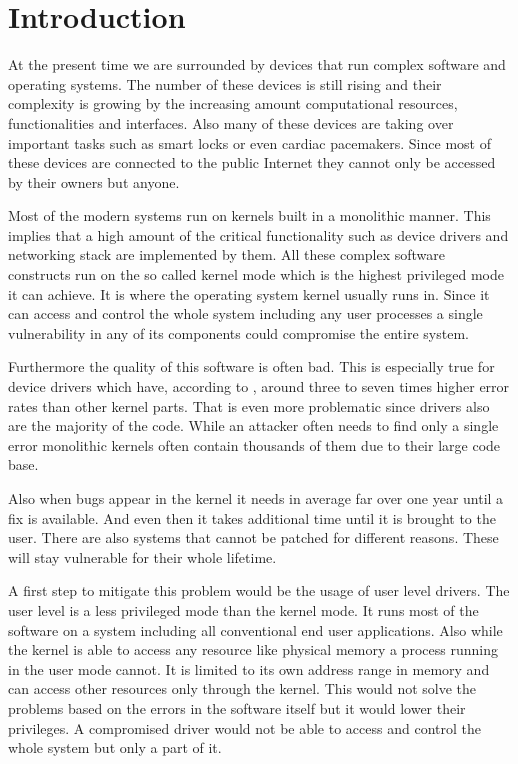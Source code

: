 \documentclass[
a4paper,
12pt,
notitlepage,
parskip=half,
DIV=11,
]{scrbook}
\begin{document}
	
	\tableofcontents
	
	\chapter{Introduction}
		
	
        At the present time we are surrounded by devices that run complex software and operating systems.
		The number of these devices is still rising and their complexity is growing by the increasing amount computational resources, functionalities and interfaces.
		Also many of these devices are taking over important tasks such as smart locks or even cardiac pacemakers.
		Since most of these devices are connected to the public Internet they cannot only be accessed by their owners but anyone.
		
		Most of the modern systems run on kernels built in a monolithic manner.
		This implies that a high amount of the critical functionality such as device drivers and networking stack are implemented by them.
		All these complex software constructs run on the so called kernel mode which is the highest privileged mode it can achieve.
		It is where the operating system kernel usually runs in.
		Since it can access and control the whole system including any user processes a single vulnerability in any of its components could compromise the entire system.
		
		Furthermore the quality of this software is often bad.
		This is especially true for device drivers which have, according to \citep{Chou:SOSP:01},  around three to seven times higher error rates than other kernel parts.
		That is even more problematic since drivers also are the majority of the code.
		While an attacker often needs to find only a single error monolithic kernels often contain thousands of them due to their large code base.
		
		Also when bugs appear in the kernel it needs in average far over one year until a fix is available.
		And even then it takes additional time until it is brought to the user.
		There are also systems that cannot be patched for different reasons.
		These will stay vulnerable for their whole lifetime. \citep{Chou:SOSP:01}
		
		A first step to mitigate this problem would be the usage of user level drivers.
		The user level is a less privileged mode than the kernel mode.
		It runs most of the software on a system including all conventional end user applications.
		Also while the kernel is able to access any resource like physical memory a process running in the user mode cannot.
		It is limited to its own address range in memory and can access other resources only through the kernel.
		This would not solve the problems based on the errors in the software itself but it would lower their privileges.
		A compromised driver would not be able to access and control the whole system but only a part of it.
		
\end{document}
